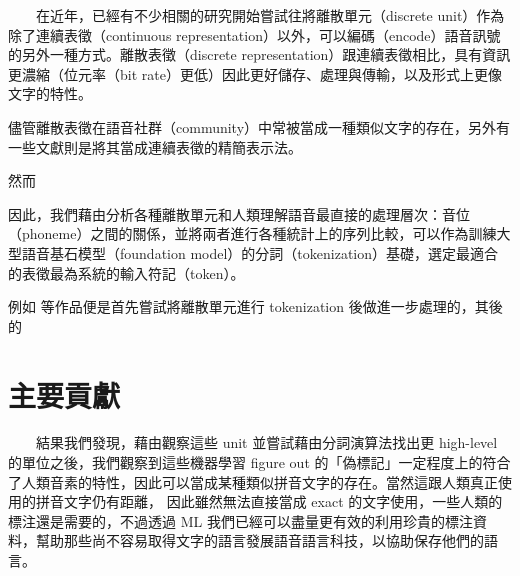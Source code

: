 　　在近年，已經有不少相關的研究開始嘗試往將離散單元（discrete unit）作為除了連續表徵（continuous representation）以外，可以編碼（encode）語音訊號的另外一種方式。離散表徵（discrete representation）跟連續表徵相比，具有資訊更濃縮（位元率（bit rate）更低）因此更好儲存、處理與傳輸，以及形式上更像文字的特性。

    儘管離散表徵在語音社群（community）中常被當成一種類似文字的存在，另外有一些文獻則是將其當成連續表徵的精簡表示法。

    然而

    因此，我們藉由分析各種離散單元和人類理解語音最直接的處理層次：音位（phoneme）之間的關係，並將兩者進行各種統計上的序列比較，可以作為訓練大型語音基石模型（foundation model）的分詞（tokenization）基礎，選定最適合的表徵最為系統的輸入符記（token）。

    例如 \cite{wu2023wav2seq} 等作品便是首先嘗試將離散單元進行 tokenization 後做進一步處理的，其後的



\section{主要貢獻}  %

　　結果我們發現，藉由觀察這些 unit 並嘗試藉由分詞演算法找出更 high-level 的單位之後，我們觀察到這些機器學習 figure out 的「偽標記」一定程度上的符合了人類音素的特性，因此可以當成某種類似拼音文字的存在。當然這跟人類真正使用的拼音文字仍有距離，
因此雖然無法直接當成 exact 的文字使用，一些人類的標注還是需要的，不過透過 ML 我們已經可以盡量更有效的利用珍貴的標注資料，幫助那些尚不容易取得文字的語言發展語音語言科技，以協助保存他們的語言。


